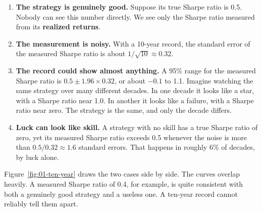 \begin{enumerate}
  \item \textbf{The strategy is genuinely good.} Suppose its true Sharpe ratio is 0.5. Nobody can see this number directly. We see only the Sharpe ratio measured from its \textbf{realized returns}.
  \item \textbf{The measurement is noisy.} With a 10-year record, the standard error of the measured Sharpe ratio is about $1/\sqrt{10} \approx 0.32$.
  \item \textbf{The record could show almost anything.} A 95\% range for the measured Sharpe ratio is $0.5 \pm 1.96 \times 0.32$, or about $-0.1$ to 1.1. Imagine watching the same strategy over many different decades. In one decade it looks like a star, with a Sharpe ratio near 1.0. In another it looks like a failure, with a Sharpe ratio near zero. The strategy is the same, and only the decade differs.
  \item \textbf{Luck can look like skill.} A strategy with no skill has a true Sharpe ratio of zero, yet its measured Sharpe ratio exceeds 0.5 whenever the noise is more than $0.5/0.32 \approx 1.6$ standard errors. That happens in roughly 6\% of decades, by luck alone.
\end{enumerate}

Figure~\ref{fig:01-ten-year} draws the two cases side by side. The curves overlap heavily. A measured Sharpe ratio of 0.4, for example, is quite consistent with both a genuinely good strategy and a useless one. A ten-year record cannot reliably tell them apart.


